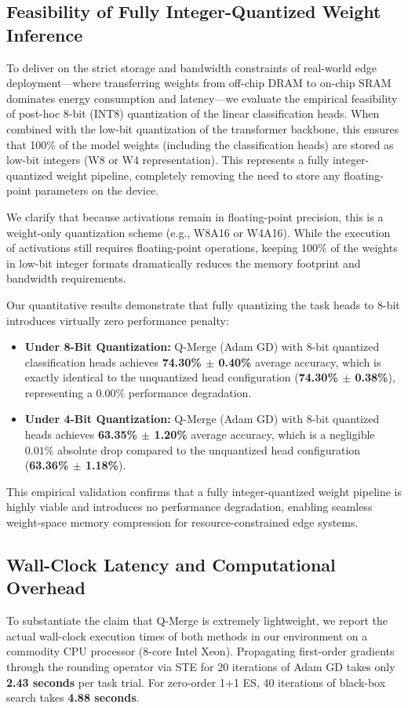 \subsection{Feasibility of Fully Integer-Quantized Weight Inference}
To deliver on the strict storage and bandwidth constraints of real-world edge deployment—where transferring weights from off-chip DRAM to on-chip SRAM dominates energy consumption and latency—we evaluate the empirical feasibility of post-hoc 8-bit (INT8) quantization of the linear classification heads. When combined with the low-bit quantization of the transformer backbone, this ensures that 100\% of the model weights (including the classification heads) are stored as low-bit integers (W8 or W4 representation). This represents a fully integer-quantized weight pipeline, completely removing the need to store any floating-point parameters on the device.

We clarify that because activations remain in floating-point precision, this is a weight-only quantization scheme (e.g., W8A16 or W4A16). While the execution of activations still requires floating-point operations, keeping 100\% of the weights in low-bit integer formats dramatically reduces the memory footprint and bandwidth requirements.

Our quantitative results demonstrate that fully quantizing the task heads to 8-bit introduces virtually zero performance penalty:
\begin{itemize}
    \item \textbf{Under 8-Bit Quantization:} Q-Merge (Adam GD) with 8-bit quantized classification heads achieves \textbf{74.30\% $\pm$ 0.40\%} average accuracy, which is exactly identical to the unquantized head configuration (\textbf{74.30\% $\pm$ 0.38\%}), representing a $0.00\%$ performance degradation.
    \item \textbf{Under 4-Bit Quantization:} Q-Merge (Adam GD) with 8-bit quantized heads achieves \textbf{63.35\% $\pm$ 1.20\%} average accuracy, which is a negligible $0.01\%$ absolute drop compared to the unquantized head configuration (\textbf{63.36\% $\pm$ 1.18\%}).
\end{itemize}
This empirical validation confirms that a fully integer-quantized weight pipeline is highly viable and introduces no performance degradation, enabling seamless weight-space memory compression for resource-constrained edge systems.

\subsection{Wall-Clock Latency and Computational Overhead}
To substantiate the claim that Q-Merge is extremely lightweight, we report the actual wall-clock execution times of both methods in our environment on a commodity CPU processor (8-core Intel Xeon). Propagating first-order gradients through the rounding operator via STE for 20 iterations of Adam GD takes only \textbf{2.43 seconds} per task trial. For zero-order 1+1 ES, 40 iterations of black-box search takes \textbf{4.88 seconds}. 

